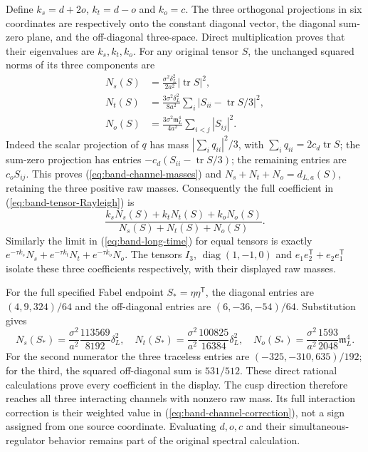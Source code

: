 Define $k_s=d+2o$, $k_t=d-o$ and $k_o=c$. The three orthogonal
projections in six coordinates are respectively onto the constant
diagonal vector, the diagonal sum-zero plane, and the off-diagonal
three-space. Direct multiplication proves that their eigenvalues
are $k_s,k_t,k_o$. For any original tensor $S$, the unchanged squared
norms of its three components are
\begin{align}
 N_s(S)&=\frac{\sigma^2\delta_L^2}{2a^2}|\operatorname{tr}S|^2,\nonumber\\
 N_t(S)&=\frac{3\sigma^2\delta_L^2}{8a^2}
                 \sum_i|S_{ii}-\operatorname{tr}S/3|^2,\nonumber\\
 N_o(S)&=\frac{3\sigma^2\mathfrak m_L^4}{4a^2}
                 \sum_{i<j}|S_{ij}|^2.
 \label{eq:band-channel-masses}
\end{align}
Indeed the scalar projection of $q$ has mass
$|\sum_iq_{ii}|^2/3$, with $\sum_iq_{ii}=2c_d\operatorname{tr}S$;
the sum-zero projection has entries
$-c_d(S_{ii}-\operatorname{tr}S/3)$; the remaining entries
are $c_oS_{ij}$. This proves (\ref{eq:band-channel-masses}) and
$N_s+N_t+N_o=d_{L,a}(S)$, retaining the three positive raw masses.
Consequently the full coefficient in (\ref{eq:band-tensor-Rayleigh}) is
\begin{equation}\label{eq:band-channel-correction}
 \frac{k_sN_s(S)+k_tN_t(S)+k_oN_o(S)}{N_s(S)+N_t(S)+N_o(S)}.
\end{equation}
Similarly the limit in (\ref{eq:band-long-time}) for equal tensors
is exactly $e^{-\tau k_s}N_s+e^{-\tau k_t}N_t+e^{-\tau k_o}N_o$.
The tensors $I_3$, $\operatorname{diag}(1,-1,0)$ and
$e_1e_2^{\mathsf T}+e_2e_1^{\mathsf T}$ isolate these three
coefficients respectively, with their displayed raw masses.

For the full specified Fabel endpoint $S_*=\eta\eta^{\mathsf T}$,
the diagonal entries are $(4,9,324)/64$ and the off-diagonal
entries are $(6,-36,-54)/64$. Substitution gives
\begin{equation}\label{eq:band-Fabel-channel-masses}
 N_s(S_*)=\frac{\sigma^2}{a^2}\frac{113569}{8192}\delta_L^2,
 \quad N_t(S_*)=\frac{\sigma^2}{a^2}\frac{100825}{16384}\delta_L^2,
 \quad N_o(S_*)=\frac{\sigma^2}{a^2}\frac{1593}{2048}\mathfrak m_L^4.
\end{equation}
For the second numerator the three traceless entries are
$(-325,-310,635)/192$; for the third, the squared off-diagonal
sum is $531/512$. These direct rational calculations prove every
coefficient in the display. The cusp direction therefore reaches
all three interacting channels with nonzero raw mass. Its full
interaction correction is their weighted value in
(\ref{eq:band-channel-correction}), not a sign assigned from one
source coordinate. Evaluating $d,o,c$ and their simultaneous-regulator
behavior remains part of the original spectral calculation.

